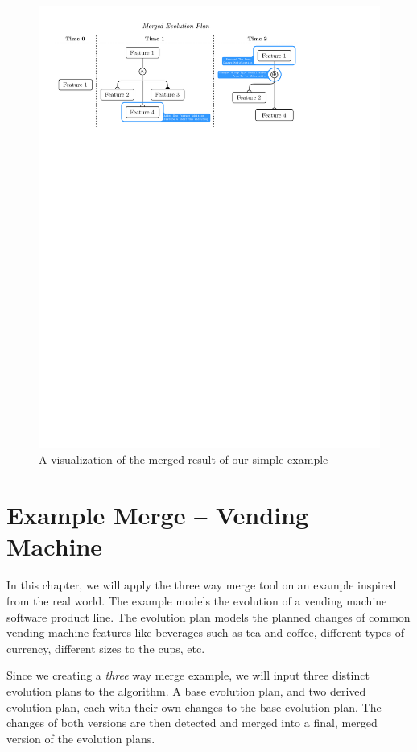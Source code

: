 \documentclass[a4paper,english]{ifimaster}
\begin{document}
\begin{figure}[htpb]
  \centering
  \includegraphics[width=\linewidth]{simple_merged_ep.pdf}
  \caption{A visualization of the merged result of our simple example}%
  \label{fig:simple_three_way_merged_result}
\end{figure}

\chapter{Example Merge – Vending Machine}%
\label{cha:example_merge_vending_machine}

In this chapter, we will apply the three way merge tool on an example inspired from the real world. The example models the evolution of a vending machine software product line. The evolution plan models the planned changes of common vending machine features like beverages such as tea and coffee, different types of currency, different sizes to the cups, etc.

Since we creating a \textit{three} way merge example, we will input three distinct evolution plans to the algorithm. A base evolution plan, and two derived evolution plan, each with their own changes to the base evolution plan. The changes of both versions are then detected and merged into a final, merged version of the evolution plans.
\end{document}
